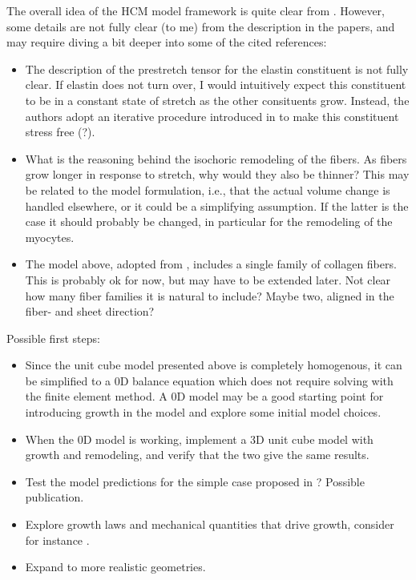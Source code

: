 \documentclass[twoside,12pt,a4paper]{article}
\begin{document}
The overall idea of the HCM model framework is quite clear from \cite{cyron2016homogenized,gebauer2022homogenized}. 
However, some details are not fully clear (to me) from the description in the papers, and may require diving a bit 
deeper into some of the cited references:
\begin{itemize}
  \item The description of the prestretch tensor for the elastin constituent is not fully clear. If elastin does not turn over,
        I would intuitively expect this constituent to be in a constant state of stretch as the other consituents grow. Instead,
        the authors adopt an iterative procedure introduced in \cite{mousavi2017patient} to make this constituent stress free (?).
  \item What is the reasoning behind the isochoric remodeling of the fibers. As fibers grow longer in response to stretch, why 
        would they also be thinner? This may be related to the model formulation, i.e., that the actual volume change is handled
        elsewhere, or it could be a simplifying assumption. If the latter is the case it should probably be changed, 
        in particular for the remodeling of the myocytes.
  \item The model above, adopted from \cite{gebauer2022homogenized}, includes a single family of collagen fibers. This is 
        probably ok for now, but may have to be extended later. Not clear how many fiber families it is natural to include? 
        Maybe two, aligned in the fiber- and sheet direction?
\end{itemize}

Possible first steps:
\begin{itemize}
  \item Since the unit cube model presented above is completely homogenous, it can be simplified to a 0D balance equation which 
        does not require solving with the finite element method. A 0D model may be a good starting point for introducing 
        growth in the model and explore some initial model choices.
  \item When the 0D model is working, implement a 3D unit cube model with growth and remodeling, and verify that the two 
        give the same results.
  \item Test the model predictions for the simple case proposed in \cite{witzenburg2017comparison}? Possible publication.
  \item Explore growth laws and mechanical quantities that drive growth, consider for instance \cite{lee2016integrated}.
  \item Expand to more realistic geometries. 
\end{itemize}







\end{document}
